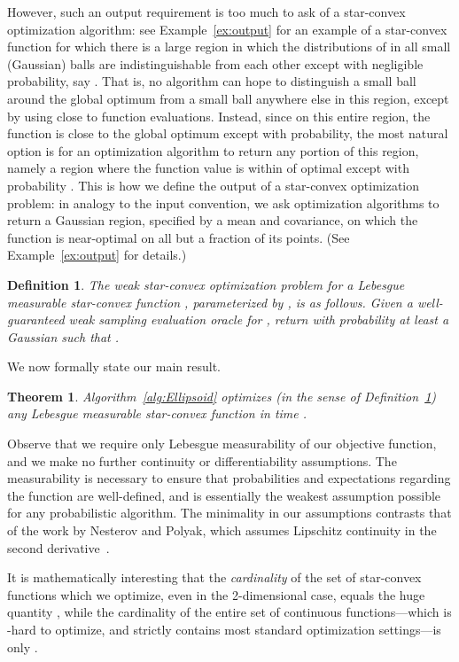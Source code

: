 \documentclass[11pt,letter]{article}
\newcounter{nTheorems}
\numberwithin{nTheorems}{section}
\newtheorem{theorem}[nTheorems]{Theorem}
\newtheorem{definition}[nTheorems]{Definition}
\begin{document}
However, such an output requirement is too much to ask of a star-convex optimization algorithm: see Example~\ref{ex:output} for an example of a star-convex function for which there is a large region in which the distributions of  in all small (Gaussian) balls are indistinguishable from each other except with negligible probability, say . That is, no algorithm can hope to distinguish a small ball around the global optimum from a small ball anywhere else in this region, except by using close to  function evaluations. Instead, since on this entire region, the function is close to the global optimum except with  probability, the most natural option is for an optimization algorithm to return any portion of this region, namely a region where the function value is within  of optimal except with probability . This is how we define the output of a star-convex optimization problem: in analogy to the input convention, we ask optimization algorithms to return a Gaussian region, specified by a mean and covariance, on which the function is near-optimal on all but a  fraction of its points. (See Example~\ref{ex:output} for details.)





\begin{definition}\label{def:problem}
  The \emph{weak star-convex optimization problem} for a Lebesgue measurable star-convex function , parameterized by , is as follows.
Given a well-guaranteed weak sampling evaluation oracle for , return with probability at least  a Gaussian  such that .
\end{definition}

We now formally state our main result.
\begin{theorem}\label{thm:main}
Algorithm~\ref{alg:Ellipsoid} optimizes (in the sense of Definition~\ref{def:problem}) any Lebesgue measurable star-convex function  in time .
\end{theorem}

Observe that we require only Lebesgue measurability of our objective function, and we make no further continuity or differentiability assumptions.
The measurability is necessary to ensure that probabilities and expectations regarding the function are well-defined, and is essentially the weakest assumption possible for any probabilistic algorithm.
The minimality in our assumptions contrasts that of the work by Nesterov and Polyak, which assumes Lipschitz continuity in the second derivative~\cite{Nesterov:2006}.

It is mathematically interesting that the \emph{cardinality} of the set of star-convex functions which we optimize, even in the 2-dimensional case, equals the huge quantity , while the cardinality of the entire set of continuous functions---which is \NP-hard to optimize, and strictly contains most standard optimization settings---is only .
\end{document}
